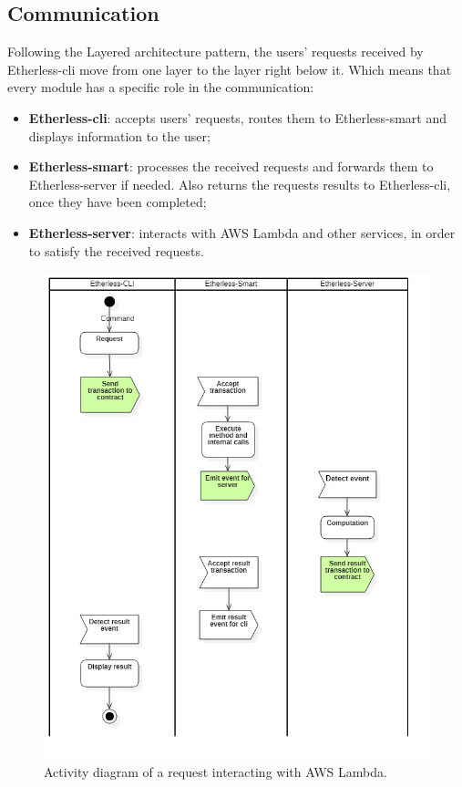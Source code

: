 	\subsection{Communication} %
	Following the Layered architecture pattern, the users' requests received by Etherless-cli move from one layer to the layer right below it. Which means that every module has a specific role in the communication:
	\begin{itemize}
		\item \textbf{Etherless-cli}: accepts users' requests, routes them to Etherless-smart and displays information to the user;
		\item \textbf{Etherless-smart}: processes the received requests and forwards them to Etherless-server if needed. Also returns the requests results to Etherless-cli, once they have been completed;
		\item \textbf{Etherless-server}: interacts with AWS Lambda and other services, in order to satisfy the received requests.
	\end{itemize}
	\begin{figure}
		\centering
		\includegraphics[width=0.9\linewidth]{diagrammi/generali/activity_diag_pattern2}
		\caption{Activity diagram of a request interacting with AWS Lambda.}
	\end{figure}
